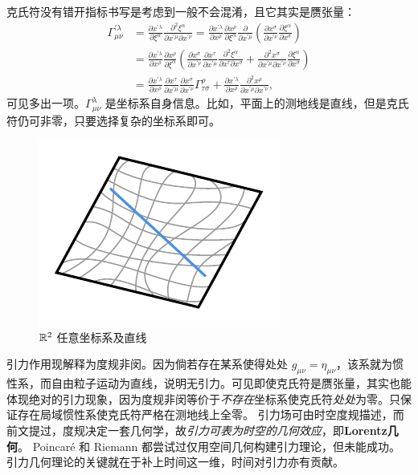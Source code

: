 克氏符没有错开指标书写是考虑到一般不会混淆，且它其实是赝张量：
\begin{align} \Gamma_{\mu \nu}^{\prime \lambda} &= \frac{\partial x^{\prime \lambda}}{\partial \xi^\alpha} \frac{\partial^2 \xi^\alpha}{\partial x^{\prime \mu} \partial x^{\prime \nu}}=\frac{\partial x^{\prime \lambda}}{\partial x^\rho} \frac{\partial x^\rho}{\partial \xi^\alpha} \frac{\partial}{\partial x^{\prime \mu}}\left(\frac{\partial x^\sigma}{\partial x^{\prime \nu}} \frac{\partial \xi^\alpha}{\partial x^\sigma}\right)\nonumber\\ 
    & =\frac{\partial x^{\prime \lambda}}{\partial x^\rho} \frac{\partial x^\rho}{\partial \xi^\alpha}\left(\frac{\partial x^\sigma}{\partial x^{\prime \nu}} \frac{\partial x^\tau}{\partial x^{\prime \mu}} \frac{\partial^2 \xi^\alpha}{\partial x^\tau \partial x^\sigma}+\frac{\partial^2 x^\sigma}{\partial x^{\prime \mu} \partial x^{\prime \nu}} \frac{\partial \xi^\alpha}{\partial x^\sigma}\right)\nonumber\\
&=\frac{\partial x^{\prime \lambda}}{\partial x^\rho} \frac{\partial x^\tau}{\partial x^{\prime \mu}} \frac{\partial x^\sigma}{\partial x^{\prime \nu}} \Gamma_{\tau \sigma}^\rho+\frac{\partial x^{\prime \lambda}}{\partial x^\rho} \frac{\partial^2 x^\rho}{\partial x^{\prime \mu} \partial x^{\prime \nu}},
\end{align}
可见多出一项。$\Gamma^{\lambda}_{\mu\nu}$ 是坐标系自身信息。比如，平面上的测地线是直线，但是克氏符仍可非零，只要选择复杂的坐标系即可。

\begin{figure}[ht]
    \centering
\includegraphics[width=.4\textwidth]{fig/chpt01/geodesic.pdf}
    \caption{ $\mathbb{R}^2$ 任意坐标系及直线}
\end{figure}

引力作用现解释为度规非闵。因为倘若存在某系使得处处 $g_{\mu\nu}=\eta_{\mu\nu}$，该系就为惯性系，而自由粒子运动为直线，说明无引力。可见即使克氏符是赝张量，其实也能体现绝对的引力现象，因为度规非闵等价于\textit{不存在}坐标系使克氏符\textit{处处}为零。只保证存在局域惯性系使克氏符严格在测地线上全零。
引力场可由时空度规描述，而前文提过，度规决定一套几何学，故\textit{引力可表为时空的几何效应}，即\textbf{Lorentz几何}。
Poincaré 和 Riemann 都尝试过仅用空间几何构建引力理论，但未能成功。引力几何理论的关键就在于补上时间这一维，时间对引力亦有贡献。

